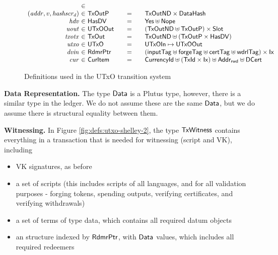 \begin{figure*}[htb]
\begin{equation*}
\begin{array}{r@{~\in~}l@{\qquad=\qquad}lr}
      \\
      (\var{addr}, v, \var{hashscr_d})
      & \type{TxOutP}
      & \type{TxOutND} \times \DataHash
      \\
      \var{hdv}
      & \HasDV
      & \Yes \uniondistinct \Nope
      \\
      \var{uout}
      & \UTxOOut
      & (\TxOutND \uniondistinct \TxOutP) \times \Slot
      \\
      \var{txotx}
      & \TxOut
      & \TxOutND \uniondistinct (\TxOutP \times \HasDV)
      \\
      \var{utxo}
      & \UTxO
      & \UTxOIn \mapsto \UTxOOut
      \\
      \var{dvin}
      & \RdmrPtr
      & (\mathsf{inputTag} \uniondistinct \mathsf{forgeTag} \uniondistinct
      \mathsf{certTag} \uniondistinct \mathsf{wdrlTag}) \times \Ix
      \\
      \var{cur}
      & \CurItem
      & \CurrencyId \uniondistinct (\TxId \times \Ix) \uniondistinct \AddrRWD \uniondistinct \DCert
    \end{array}
  \end{equation*}
  \caption{Definitions used in the UTxO transition system}
  \label{fig:defs:utxo-shelley-1}
\end{figure*}


\textbf{Data Representation.}
The type $\mathsf{Data}$ is a Plutus type, however, there is a similar type in the
ledger. We do not assume these are the same $\mathsf{Data}$, but we do assume there
is structural equality between them.

\textbf{Witnessing.}
In Figure \ref{fig:defs:utxo-shelley-2}, the type $\mathsf{TxWitness}$ contains everything
in a transaction that is needed for witnessing (script and VK), including

\begin{itemize}
  \item VK signatures, as before
  \item a set of scripts (this includes scripts of all languages, and for all
  validation purposes - forging tokens, spending outputs, verifying certificates, and
  verifying withdrawals)
  \item a set of terms of type data, which contains all required datum objects
  \item an structure indexed by $\mathsf{RdmrPtr}$, with $\mathsf{Data}$ values, which includes all
  required redeemers
\end{itemize}

